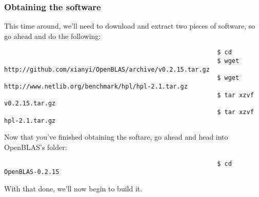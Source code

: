 \documentclass[]{article}
\begin{document}
                                                          \subsubsection{Obtaining the software}
                                                          This time around, we'll need to download and extract two pieces of software, so go ahead and do the following:
                                                          \begin{lstlisting}
                                                          $ cd
                                                          $ wget http://github.com/xianyi/OpenBLAS/archive/v0.2.15.tar.gz
                                                          $ wget http://www.netlib.org/benchmark/hpl/hpl-2.1.tar.gz
                                                          $ tar xzvf v0.2.15.tar.gz
                                                          $ tar xzvf hpl-2.1.tar.gz
                                                          \end{lstlisting}
                                                          Now that you've finished obtaining the softare, go ahead and head into OpenBLAS's folder:
                                                          \begin{lstlisting}
                                                          $ cd OpenBLAS-0.2.15
                                                          \end{lstlisting}
                                                          With that done, we'll now begin to build it.
\end{document}
